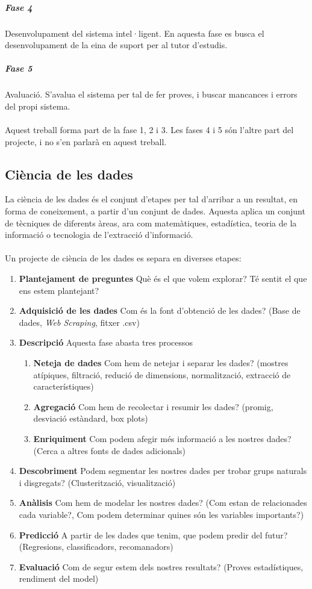 \documentclass[12pt,a4paper,catalan]{article}
\begin{document}
\subparagraph{Fase 4}
Desenvolupament del sistema intel·ligent. En aquesta fase es busca el desenvolupament de la eina de suport per al tutor d'estudis.

\subparagraph{Fase 5}
Avaluació. S'avalua el sistema per tal de fer proves, i buscar mancances i errors del propi sistema.
\\
\\
Aquest treball forma part de la fase 1, 2 i 3. Les fases 4 i 5 són l'altre part del projecte, i no s'en parlarà en aquest treball.

\subsection{Ciència de les dades}
La ciència de les dades és el conjunt d'etapes per tal d'arribar a un resultat, en forma de coneixement, a partir d'un conjunt de dades. Aquesta aplica un conjunt de tècniques de diferents àreas, ara com matemàtiques, estadística, teoria de la informació o tecnologia de l'extracció d'informació.
\\
\\
Un projecte de ciència de les dades es separa en diverses etapes:
\begin{enumerate}
	\item \textbf{Plantejament de preguntes} Què és el que volem explorar? Té sentit el que ens estem plantejant?
	\item \textbf{Adquisició de les dades} Com és la font d'obtenció de les dades? (Base de dades, \textit{Web Scraping}, fitxer .csv)
	\item \textbf{Descripció} Aquesta fase abasta tres processos
	\begin{enumerate}
		\item \textbf{Neteja de dades} Com hem de netejar i separar les dades? (mostres atípiques, filtració, redució de dimensions, normalització, extracció de característiques)
		\item \textbf{Agregació} Com hem de recolectar i resumir les dades? (promig, desviació estàndard, box plots)
		\item \textbf{Enriquiment} Com podem afegir més informació a les nostres dades? (Cerca a altres fonts de dades adicionals)
	\end{enumerate}
	\item \textbf{Descobriment} Podem segmentar les nostres dades per trobar grups naturals i disgregats? (Clusterització, visualització)
	\item \textbf{Anàlisis} Com hem de modelar les nostres dades? (Com estan de relacionades cada variable?, Com podem determinar quines són les variables importants?)
	\item \textbf{Predicció} A partir de les dades que tenim, que podem predir del futur? (Regresions, classificadors, recomanadors)
	\item \textbf{Evaluació} Com de segur estem dels nostres resultats? (Proves estadístiques, rendiment del model)
\end{enumerate}
\end{document}
